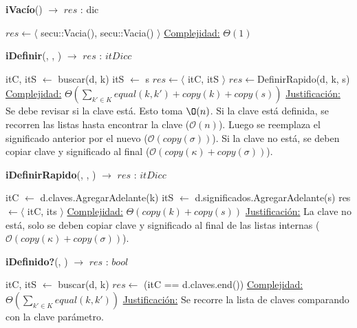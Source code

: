 \documentclass[a4paper,10pt]{article}
\begin{document}
\begin{Algoritmos}

\begin{algorithm}[H]{\textbf{iVacío}() $\to$ $res$ : dic}
  \begin{algorithmic}[1]
      \State $res \gets \langle$ secu::Vacia(), secu::Vacia() $\rangle$
      \medskip
      \Statex \underline{Complejidad:} $\Theta(1)$
  \end{algorithmic}
\end{algorithm}

\begin{algorithm}[H]{\textbf{iDefinir}(, , ) $\to$ $res$ : $itDicc$}
\begin{algorithmic}
        \State itC, itS $\gets$ buscar(d, k)
        \State *itS $\gets$ s
        \State $res \gets \langle$ itC, itS $\rangle$
    \Else
        $res \gets $DefinirRapido(d, k, s)
    \EndIf
    \Statex \underline{Complejidad:} $\Theta\left(\sum_{k' \in K}equal(k,k') + copy(k) + copy(s)\right)$
    \Statex \underline{Justificación:} Se debe revisar si la clave está. Esto
    toma $\O(n)$. Si la clave está definida, se recorren las listas hasta
    encontrar la clave ($\mathcal{O}(n)$). Luego se reemplaza el significado
    anterior por el nuevo ($\mathcal{O}(copy(\sigma))$). Si la clave no está,
    se deben copiar clave y significado al final ($\mathcal{O}(copy(\kappa) +
    copy(\sigma))$).
\end{algorithmic}
\end{algorithm}

\begin{algorithm}[H]{\textbf{iDefinirRapido}(, , ) $\to$ $res$ : $itDicc$}
\begin{algorithmic}
    \State itC $\gets$ d.claves.AgregarAdelante(k)
    \State itS $\gets$ d.significados.AgregarAdelante(s)
    \State res $\gets \langle$ itC, its $\rangle$
    \Statex \underline{Complejidad:} $\Theta\left(copy(k) + copy(s)\right)$
    \Statex \underline{Justificación:} La clave no está, solo
    se deben copiar clave y significado al final de las
    listas internas ($\mathcal{O}(copy(\kappa) + copy(\sigma))$).
\end{algorithmic}
\end{algorithm}

\begin{algorithm}[H]{\textbf{iDefinido?}(, )
    $\to$ $res$ : $bool$}
\begin{algorithmic}
    \State itC, itS $\gets$ buscar(d, k)
    \State $res \gets$ (itC == d.claves.end())
    \Statex \underline{Complejidad:} $\Theta(\sum_{k' \in K}equal(k,k'))$
    \Statex \underline{Justificación:} Se recorre la lista de claves comparando
    con la clave parámetro.
\end{algorithmic}
\end{algorithm}


\end{Algoritmos}
\end{document}
